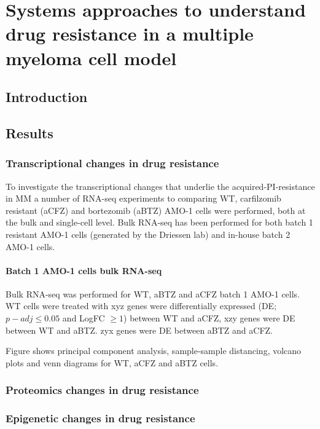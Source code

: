 \chapter{\label{ch:5-results_systems}Systems approaches to understand drug resistance in a multiple myeloma cell model}

\section{Introduction}\label{sec:systems_intro}

\section{Results}\label{sec:systems_results}


\subsection{Transcriptional changes in drug resistance}\label{subsec:systems_transcriptomics}

To investigate the transcriptional changes that underlie the acquired-PI-resistance in MM a number of RNA-seq experiments to comparing WT, carfilzomib resistant (aCFZ) and bortezomib (aBTZ) AMO-1 cells were performed, both at the bulk and single-cell level.
Bulk RNA-seq has been performed for both batch 1 resistant AMO-1 cells (generated by the Driessen lab) and in-house batch 2 AMO-1 cells.

\subsubsection{Batch 1 AMO-1 cells bulk RNA-seq}
Bulk RNA-seq was performed for WT, aBTZ and aCFZ batch 1 AMO-1 cells.
WT cells were treated with
xyz genes were differentially expressed (DE; $p-adj\leq0.05$ and LogFC $\geq1$) between WT and aCFZ, xzy genes were DE between WT and aBTZ\@.
zyx genes were DE between aBTZ and aCFZ\@.

Figure {} shows principal component analysis, sample-sample distancing, volcano plots and venn diagrams for WT, aCFZ and aBTZ cells.


\subsection{Proteomics changes in drug resistance}\label{subsec:systems_proteomics}


\subsection{Epigenetic changes in drug resistance}\label{subsec:systems_epigenetics}

